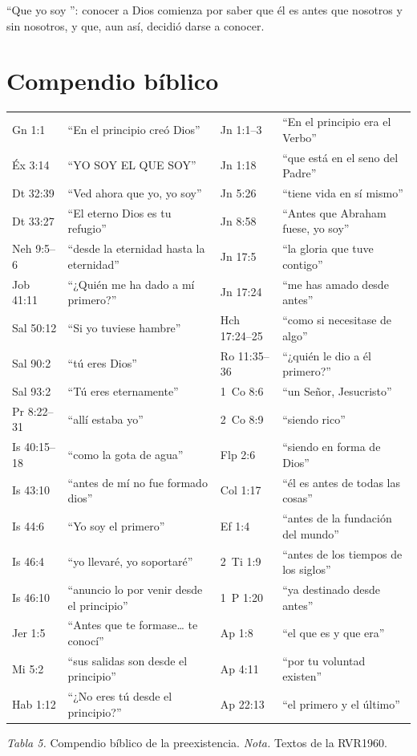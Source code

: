 ``Que yo soy \SENOR'': conocer a Dios comienza por saber que él es antes que nosotros y sin nosotros, y que, aun así, decidió darse a conocer.

\section*{Compendio bíblico}
\begin{center}\small\renewcommand{\arraystretch}{1.12}
\begin{tabular}{@{}L{2.2cm}L{5.0cm}|L{2.2cm}L{5.0cm}@{}}
\toprule
Gn 1:1 & ``En el principio creó Dios'' & Jn 1:1--3 & ``En el principio era el Verbo'' \\
Éx 3:14 & ``YO SOY EL QUE SOY'' & Jn 1:18 & ``que está en el seno del Padre'' \\
Dt 32:39 & ``Ved ahora que yo, yo soy'' & Jn 5:26 & ``tiene vida en sí mismo'' \\
Dt 33:27 & ``El eterno Dios es tu refugio'' & Jn 8:58 & ``Antes que Abraham fuese, yo soy'' \\
Neh 9:5--6 & ``desde la eternidad hasta la eternidad'' & Jn 17:5 & ``la gloria que tuve contigo'' \\
Job 41:11 & ``¿Quién me ha dado a mí primero?'' & Jn 17:24 & ``me has amado desde antes'' \\
Sal 50:12 & ``Si yo tuviese hambre'' & Hch 17:24--25 & ``como si necesitase de algo'' \\
Sal 90:2 & ``tú eres Dios'' & Ro 11:35--36 & ``¿quién le dio a él primero?'' \\
Sal 93:2 & ``Tú eres eternamente'' & 1~Co 8:6 & ``un Señor, Jesucristo'' \\
Pr 8:22--31 & ``allí estaba yo'' & 2~Co 8:9 & ``siendo rico'' \\
Is 40:15--18 & ``como la gota de agua'' & Flp 2:6 & ``siendo en forma de Dios'' \\
Is 43:10 & ``antes de mí no fue formado dios'' & Col 1:17 & ``él es antes de todas las cosas'' \\
Is 44:6 & ``Yo soy el primero'' & Ef 1:4 & ``antes de la fundación del mundo'' \\
Is 46:4 & ``yo llevaré, yo soportaré'' & 2~Ti 1:9 & ``antes de los tiempos de los siglos'' \\
Is 46:10 & ``anuncio lo por venir desde el principio'' & 1~P 1:20 & ``ya destinado desde antes'' \\
Jer 1:5 & ``Antes que te formase\ldots{} te conocí'' & Ap 1:8 & ``el que es y que era'' \\
Mi 5:2 & ``sus salidas son desde el principio'' & Ap 4:11 & ``por tu voluntad existen'' \\
Hab 1:12 & ``¿No eres tú desde el principio?'' & Ap 22:13 & ``el primero y el último'' \\
\bottomrule
\end{tabular}\par
{\footnotesize\color{gris}\textit{Tabla 5.} Compendio bíblico de la preexistencia. \textit{Nota.} Textos de la RVR1960.}
\end{center}

